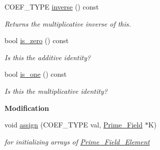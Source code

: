 \begin{Indent}
\begin{DoxyCompactItemize}
C\+O\+E\+F\+\_\+\+T\+Y\+PE \hyperlink{group___fields_group_a7e5881bb8b3f94aa8686e38e7ac78d65}{inverse} () const
\begin{DoxyCompactList}\small\item\em Returns the multiplicative inverse of {\ttfamily this}. \end{DoxyCompactList}\item 
\mbox{\label{group___fields_group_a50a94575283b1297a93eb41c22c599b2}} 
bool \hyperlink{group___fields_group_a50a94575283b1297a93eb41c22c599b2}{is\+\_\+zero} () const
\begin{DoxyCompactList}\small\item\em Is {\ttfamily this} the additive identity? \end{DoxyCompactList}\item 
\mbox{\label{group___fields_group_a69c26a37c2d6d3c996360d4f37cf6d98}} 
bool \hyperlink{group___fields_group_a69c26a37c2d6d3c996360d4f37cf6d98}{is\+\_\+one} () const
\begin{DoxyCompactList}\small\item\em Is {\ttfamily this} the multiplicative identity? \end{DoxyCompactList}\end{DoxyCompactItemize}
\end{Indent}
\begin{Indent}\textbf{ Modification}\par
\begin{DoxyCompactItemize}
\item 
\mbox{\label{group___fields_group_a4abca8a2002d098db965b77b17178f46}} 
void \hyperlink{group___fields_group_a4abca8a2002d098db965b77b17178f46}{assign} (C\+O\+E\+F\+\_\+\+T\+Y\+PE val, \hyperlink{group___fields_group_class_prime___field}{Prime\+\_\+\+Field} $\ast$K)
\begin{DoxyCompactList}\small\item\em for initializing arrays of \hyperlink{group___fields_group_class_prime___field___element}{Prime\+\_\+\+Field\+\_\+\+Element} \end{DoxyCompactList}\end{DoxyCompactItemize}
\end{Indent}
